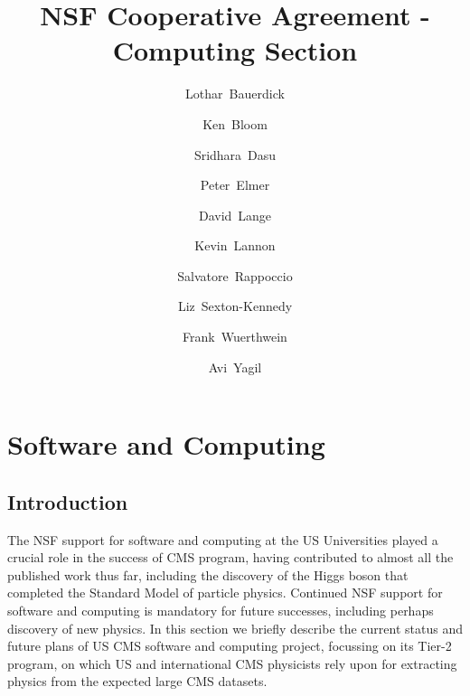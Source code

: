 \documentclass[11pt,a4paper]{article}
\begin{document}
\title{NSF Cooperative Agreement - Computing Section}

\author[1]{Lothar~Bauerdick}

\author[2]{Ken~Bloom}

\author[3]{Sridhara~Dasu}

\author[4]{Peter~Elmer}

\author[5]{David~Lange}

\author[6]{Kevin~Lannon}

\author[7]{Salvatore~Rappoccio}

\author[1]{Liz~Sexton-Kennedy}

\author[8]{Frank~Wuerthwein}

\author[8]{Avi~Yagil}


\renewcommand\Authands{ and }

\maketitle

\newpage

\section{Software and Computing}

\subsection{Introduction}

The NSF support for software and computing at the US Universities
played a crucial role in the success of CMS program, having
contributed to almost all the published work thus far, including the
discovery of the Higgs boson that completed the Standard Model of
particle physics.  Continued NSF support for software and computing is
mandatory for future successes, including perhaps discovery of new
physics.  In this section we briefly describe the current status and
future plans of US CMS software and computing project, focussing on
its Tier-2 program, on which US and international CMS physicists rely
upon for extracting physics from the expected large CMS datasets.
\end{document}
